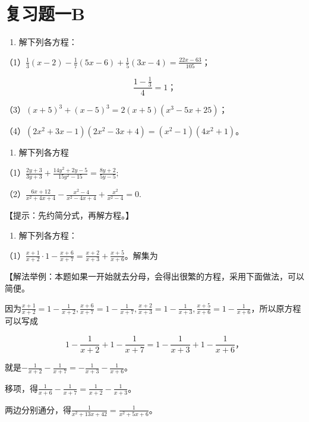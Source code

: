 \section{复习题一B}

\begin{enumerate}
\item
  解下列各方程：
\end{enumerate}

（1）\(\frac{1}{3} (x - 2) - \frac{1}{7} (5x - 6) + \frac{1}{5} (3x - 4) = \frac{22x - 63}{105}\)；

\[
\frac{1 - \frac{1}{3}}{4} = 1\text{；} \tag{2}
\]

（3）\((x + 5)^{3} + (x - 5)^{3} = 2(x + 5)(x^{3} - 5x + 25)\)；

（4）\((2x^{2} + 3x - 1)(2x^{2} - 3x + 4) = (x^{2} - 1)(4x^{2} + 1)\)。

\begin{enumerate}[start=2]
\item
  解下列各方程
\end{enumerate}

（1）\(\frac{2y + 3}{3y + 3} + \frac{14y^2 + 2y - 5}{15y^2 - 15} = \frac{8y + 2}{5y - 5};\)

（2）\(\frac{6x + 12}{x^2 + 4x + 4} - \frac{x^2 - 4}{x^2 - 4x + 4} + \frac{x^2}{x^2 - 4} = 0.\)

【提示：先约简分式，再解方程。】

\begin{enumerate}[start=3]
\item
  解下列各方程：
\end{enumerate}

（1）\(\frac{x + 1}{x + 2} \cdot 1 - \frac{x + 6}{x + 7} = \frac{x + 2}{x + 3} + \frac{x + 5}{x + 6}\)。解集为

【解法举例：本题如果一开始就去分母，会得出很繁的方程，采用下面做法，可以简便。

因为\(\frac{x + 1}{x + 2} = 1 - \frac{1}{x + 2}, \frac{x + 6}{x + 7} = 1 - \frac{1}{x + 7}, \frac{x + 2}{x + 3} = 1 - \frac{1}{x + 3}, \frac{x + 5}{x + 6} = 1 - \frac{1}{x + 6}\)，所以原方程可以写成

\[
1 - \frac{1}{x + 2} + 1 - \frac{1}{x + 7} = 1 - \frac{1}{x + 3} + 1 - \frac{1}{x + 6}\text{，}
\]

就是\(-\frac{1}{x + 2} - \frac{1}{x + 7} = -\frac{1}{x + 3} - \frac{1}{x + 6}\)。

移项，得\(\frac{1}{x + 6} - \frac{1}{x + 7} = \frac{1}{x + 2} - \frac{1}{x + 3}\)。

两边分别通分，得\(\frac{1}{x^{2}+13x+42}=\frac{1}{x^{2}+5x+6}\)。


